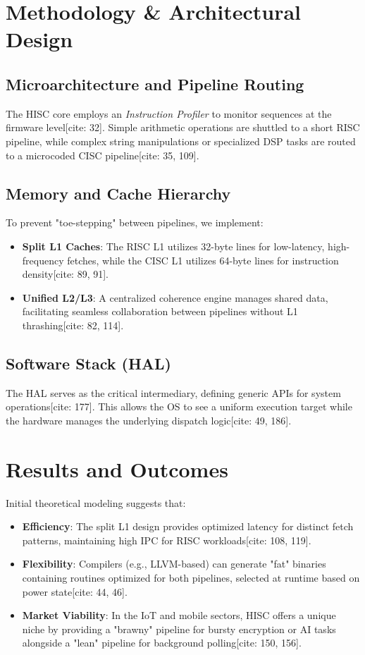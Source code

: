 \documentclass[twocolumn, 10pt]{article}
\begin{document}
\section{Methodology & Architectural Design}

\subsection{Microarchitecture and Pipeline Routing}
The HISC core employs an \textit{Instruction Profiler} to monitor sequences at the firmware level[cite: 32]. Simple arithmetic operations are shuttled to a short RISC pipeline, while complex string manipulations or specialized DSP tasks are routed to a microcoded CISC pipeline[cite: 35, 109].

\subsection{Memory and Cache Hierarchy}
To prevent "toe-stepping" between pipelines, we implement:
\begin{itemize}
    \item \textbf{Split L1 Caches}: The RISC L1 utilizes 32-byte lines for low-latency, high-frequency fetches, while the CISC L1 utilizes 64-byte lines for instruction density[cite: 89, 91].
    \item \textbf{Unified L2/L3}: A centralized coherence engine manages shared data, facilitating seamless collaboration between pipelines without L1 thrashing[cite: 82, 114].
\end{itemize}

\subsection{Software Stack (HAL)}
The HAL serves as the critical intermediary, defining generic APIs for system operations[cite: 177]. This allows the OS to see a uniform execution target while the hardware manages the underlying dispatch logic[cite: 49, 186].

\section{Results and Outcomes}
Initial theoretical modeling suggests that:
\begin{itemize}
    \item \textbf{Efficiency}: The split L1 design provides optimized latency for distinct fetch patterns, maintaining high IPC for RISC workloads[cite: 108, 119].
    \item \textbf{Flexibility}: Compilers (e.g., LLVM-based) can generate "fat" binaries containing routines optimized for both pipelines, selected at runtime based on power state[cite: 44, 46].
    \item \textbf{Market Viability}: In the IoT and mobile sectors, HISC offers a unique niche by providing a "brawny" pipeline for bursty encryption or AI tasks alongside a "lean" pipeline for background polling[cite: 150, 156].
\end{itemize}
\end{document}
